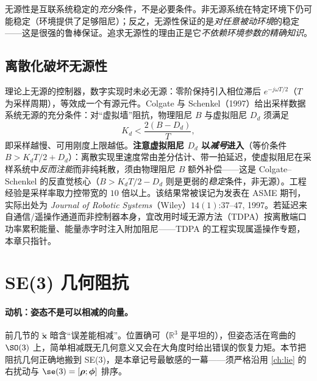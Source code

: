 \begin{pitfall}
无源性是互联系统稳定的\emph{充分}条件，不是必要条件。非无源系统在特定环境下仍可能稳定（环境提供了足够阻尼）；反之，无源性保证的是\emph{对任意被动环境}的稳定——这是很强的鲁棒保证。追求无源性的理由正是它\emph{不依赖环境参数的精确知识}。
\end{pitfall}

\subsection{离散化破坏无源性}
\label{sec:os-discretization}

理论上无源的控制器，数字实现时未必无源：零阶保持引入相位滞后 $e^{-j\omega T/2}$（$T$ 为采样周期），等效成一个有源元件。Colgate 与 Schenkel（1997）给出采样数据系统无源的充分条件\cite{colgate1997passivity}：对“虚拟墙”阻抗，物理阻尼 $B$ 与虚拟阻尼 $D_d$ 须满足
\begin{equation}
  K_d<\frac{2(B-D_d)}{T},
  \label{eq:os-discrete-passive}
\end{equation}
即采样越慢、可用刚度上限越低。\textbf{注意虚拟阻尼 $D_d$ 以\emph{减号}进入}（等价条件 $B>K_dT/2+D_d$）：离散实现里速度常由差分估计、带一拍延迟，使虚拟阻尼在采样系统中\emph{反而注能}而非纯耗散，须由物理阻尼 $B$ 额外补偿——这是 Colgate--Schenkel 的反直觉核心（$B>K_dT/2-D_d$ 则是更弱的\emph{稳定}条件，非无源）。工程经验是采样率取力控带宽的 $10$ 倍以上。该结果常被误记为发表在 ASME 期刊，实际出处为 \emph{Journal of Robotic Systems}（Wiley）$14(1)$:$37$--$47$, 1997。若延迟来自通信/遥操作通道而非控制器本身，宜改用时域无源方法（TDPA）按离散端口功率累积能量、能量赤字时注入附加阻尼——TDPA 的工程实现属遥操作专题，本章只指针。

\section{SE(3) 几何阻抗}
\label{sec:os-se3}

\paragraph{动机：姿态不是可以相减的向量。}
前几节的 $\tilde{\mathbf x}$ 暗含“误差能相减”。位置确可（$\mathbb R^3$ 是平坦的），但姿态活在弯曲的 $\SO(3)$ 上，简单相减既无几何意义又会在大角度时给出错误的恢复力矩。本节把阻抗几何正确地搬到 SE(3)，是本章记号最敏感的一幕——须严格沿用 \cref{ch:lie} 的右扰动与 $\se(3)=[\boldsymbol\rho;\boldsymbol\phi]$ 排序。

